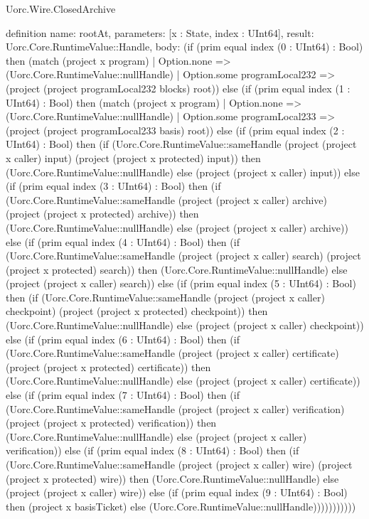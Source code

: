 \begin{lexlean}{Uorc.Wire.ClosedArchive}
\begin{semanticmodule}
definition{
  name: rootAt,
  parameters: [x : State, index : UInt64],
  result: Uorc.Core.RuntimeValue::Handle,
  body: (if (prim equal index (0 : UInt64) : Bool) then (match (project x program)
    | Option.none => (Uorc.Core.RuntimeValue::nullHandle)
    | Option.some programLocal232 => (project (project programLocal232 blocks) root)) else (if (prim equal index (1 : UInt64) : Bool) then (match (project x program)
    | Option.none => (Uorc.Core.RuntimeValue::nullHandle)
    | Option.some programLocal233 => (project (project programLocal233 basis) root)) else (if (prim equal index (2 : UInt64) : Bool) then (if (Uorc.Core.RuntimeValue::sameHandle (project (project x caller) input) (project (project x protected) input)) then (Uorc.Core.RuntimeValue::nullHandle) else (project (project x caller) input)) else (if (prim equal index (3 : UInt64) : Bool) then (if (Uorc.Core.RuntimeValue::sameHandle (project (project x caller) archive) (project (project x protected) archive)) then (Uorc.Core.RuntimeValue::nullHandle) else (project (project x caller) archive)) else (if (prim equal index (4 : UInt64) : Bool) then (if (Uorc.Core.RuntimeValue::sameHandle (project (project x caller) search) (project (project x protected) search)) then (Uorc.Core.RuntimeValue::nullHandle) else (project (project x caller) search)) else (if (prim equal index (5 : UInt64) : Bool) then (if (Uorc.Core.RuntimeValue::sameHandle (project (project x caller) checkpoint) (project (project x protected) checkpoint)) then (Uorc.Core.RuntimeValue::nullHandle) else (project (project x caller) checkpoint)) else (if (prim equal index (6 : UInt64) : Bool) then (if (Uorc.Core.RuntimeValue::sameHandle (project (project x caller) certificate) (project (project x protected) certificate)) then (Uorc.Core.RuntimeValue::nullHandle) else (project (project x caller) certificate)) else (if (prim equal index (7 : UInt64) : Bool) then (if (Uorc.Core.RuntimeValue::sameHandle (project (project x caller) verification) (project (project x protected) verification)) then (Uorc.Core.RuntimeValue::nullHandle) else (project (project x caller) verification)) else (if (prim equal index (8 : UInt64) : Bool) then (if (Uorc.Core.RuntimeValue::sameHandle (project (project x caller) wire) (project (project x protected) wire)) then (Uorc.Core.RuntimeValue::nullHandle) else (project (project x caller) wire)) else (if (prim equal index (9 : UInt64) : Bool) then (project x basisTicket) else (Uorc.Core.RuntimeValue::nullHandle)))))))))))
}


\end{semanticmodule}
\end{lexlean}
